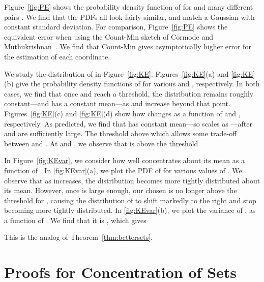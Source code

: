 \documentclass[letterpaper,11pt]{article}
\begin{document}
Figure~\ref{fig:PE} shows the probability density
function of  for  and many different pairs .  We find that the PDFs all look fairly similar, and match a
Gaussian with constant standard deviation.  For comparison,
Figure~\ref{fig:PE} shows the equivalent error when
using the Count-Min sketch of Cormode and Muthukrishnan~\cite{CM04}.  We find that
Count-Min gives asymptotically higher error for the estimation of each
coordinate.


We study the distribution of  in Figure~\ref{fig:KE}.
Figures~\ref{fig:KE}(a) and \ref{fig:KE}(b) give the probability
density functions of  for various  and ,
respectively.  In both cases, we find that once  and  reach a
threshold, the distribution remains roughly constant---and has a
constant mean---as  and  increase beyond that
point. Figures~\ref{fig:KE}(c) and \ref{fig:KE}(d) show how 
changes as a function of  and , respectively.  As predicted, we
find that  has constant mean---so  scales
as ---after  and  are sufficiently large.  The
threshold above which  allows some
trade-off between  and .  At  and , we observe
that  is above the
threshold.

In Figure~\ref{fig:KEvar}, we consider how well  concentrates
about its mean as a function of .  In \ref{fig:KEvar}(a), we plot
the PDF of  for various values of .  We
observe that as  increases, the distribution becomes more tightly
distributed about its mean.  However, once  is large enough, our
chosen  is no longer above the threshold for , causing the
distribution of  to shift markedly to the right and
stop becoming more tightly distributed.  In \ref{fig:KEvar}(b), we plot the
variance of , as a function of .  We find that it is , which gives

This is the analog of Theorem~\ref{thm:bettersets}.






\appendix

\section{Proofs for Concentration of Sets} \label{app:sets}
\end{document}
